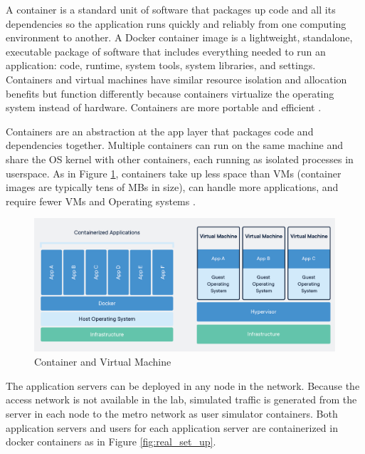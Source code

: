 \documentclass[conference]{IEEEtran}
\begin{document}
A container is a standard unit of software that packages up code and all its dependencies so the application runs quickly and reliably from one computing environment to another. A Docker container image is a lightweight, standalone, executable package of software that includes everything needed to run an application: code, runtime, system tools, system libraries, and settings. Containers and virtual machines have similar resource isolation and allocation benefits but function differently because containers virtualize the operating system instead of hardware. Containers are more portable and efficient \cite{7036275}.

Containers are an abstraction at the app layer that packages code and dependencies together. Multiple containers can run on the same machine and share the OS kernel with other containers, each running as isolated processes in userspace. As in Figure \ref{fig:container_img}, containers take up less space than VMs (container images are typically tens of MBs in size), can handle more applications, and require fewer VMs and Operating systems \cite{docker}.

\begin{figure}[]
    \centering
        \includegraphics[scale = 0.25]{imgs/container-VM.png}
        \caption{Container and Virtual Machine}
        \label{fig:container_img}
    \end{figure}

The application servers can be deployed in any node in the network. Because the access network is not available in the lab, simulated traffic is generated from the server in each node to the metro network as user simulator containers. Both application servers and users for each application server are containerized in docker containers as in Figure \ref{fig:real_set_up}.
\end{document}
